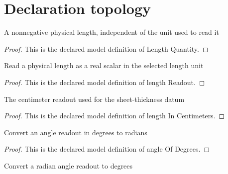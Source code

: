 \section{Declaration topology}
\begin{definition}
  \label{def:physics:phyx-mini-0155:phyxminiproblems-problemphyxmini0155-lengthquantity}
  A nonnegative physical length, independent of the unit used to read it
\end{definition}
\begin{proof}
  This is the declared model definition of Length Quantity.
\end{proof}
\begin{definition}
  \label{def:physics:phyx-mini-0155:phyxminiproblems-problemphyxmini0155-lengthreadout}
  Read a physical length as a real scalar in the selected length unit
\end{definition}
\begin{proof}
  This is the declared model definition of length Readout.
\end{proof}
\begin{definition}
  \label{def:physics:phyx-mini-0155:phyxminiproblems-problemphyxmini0155-lengthincentimeters}
  The centimeter readout used for the sheet-thickness datum
\end{definition}
\begin{proof}
  This is the declared model definition of length In Centimeters.
\end{proof}
\begin{definition}
  \label{def:physics:phyx-mini-0155:phyxminiproblems-problemphyxmini0155-angleofdegrees}
  Convert an angle readout in degrees to radians
\end{definition}
\begin{proof}
  This is the declared model definition of angle Of Degrees.
\end{proof}
\begin{definition}
  \label{def:physics:phyx-mini-0155:phyxminiproblems-problemphyxmini0155-angleindegrees}
  Convert a radian angle readout to degrees
\end{definition}
